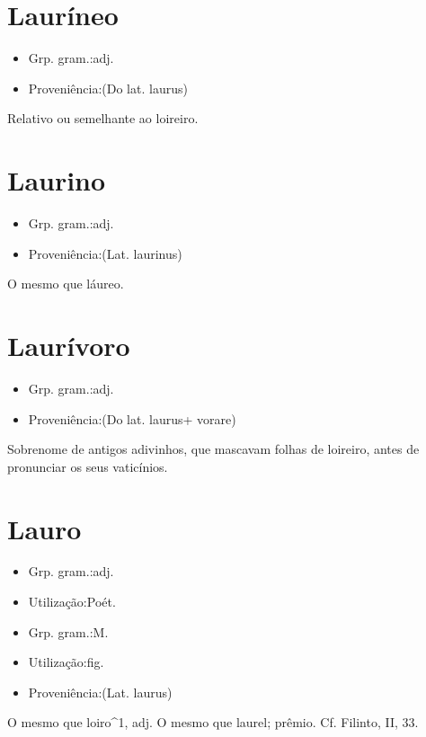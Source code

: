 \section{Lauríneo}
\begin{itemize}
\item {Grp. gram.:adj.}
\end{itemize}
\begin{itemize}
\item {Proveniência:(Do lat. \textunderscore laurus\textunderscore )}
\end{itemize}
Relativo ou semelhante ao loireiro.
\section{Laurino}
\begin{itemize}
\item {Grp. gram.:adj.}
\end{itemize}
\begin{itemize}
\item {Proveniência:(Lat. \textunderscore laurinus\textunderscore )}
\end{itemize}
O mesmo que \textunderscore láureo\textunderscore .
\section{Laurívoro}
\begin{itemize}
\item {Grp. gram.:adj.}
\end{itemize}
\begin{itemize}
\item {Proveniência:(Do lat. \textunderscore laurus\textunderscore  + \textunderscore vorare\textunderscore )}
\end{itemize}
Sobrenome de antigos adivinhos, que mascavam folhas de loireiro, antes de pronunciar os seus vaticínios.
\section{Lauro}
\begin{itemize}
\item {Grp. gram.:adj.}
\end{itemize}
\begin{itemize}
\item {Utilização:Poét.}
\end{itemize}
\begin{itemize}
\item {Grp. gram.:M.}
\end{itemize}
\begin{itemize}
\item {Utilização:fig.}
\end{itemize}
\begin{itemize}
\item {Proveniência:(Lat. \textunderscore laurus\textunderscore )}
\end{itemize}
O mesmo que \textunderscore loiro\textunderscore ^1, adj.
O mesmo que \textunderscore laurel\textunderscore ; prêmio. Cf. Filinto, II, 33.
